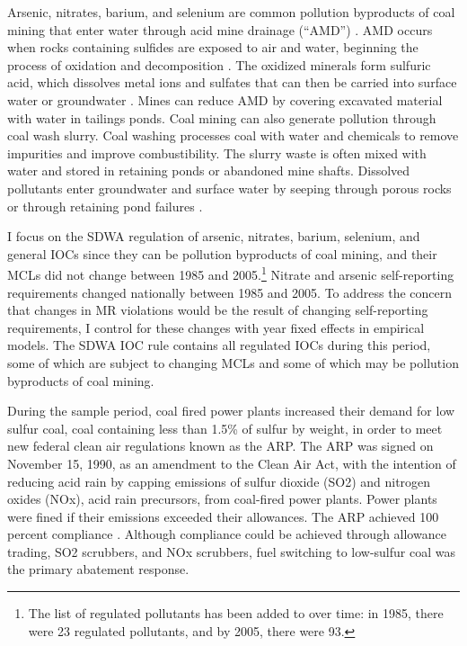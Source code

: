 \documentclass[12pt]{article}
\begin{document}
Arsenic, nitrates, barium, and selenium are common pollution byproducts of coal mining that enter water through acid mine drainage (``AMD'') \parencite{liang2017spatial, boente2020benzo, rouhani2023overview}. AMD occurs when rocks containing sulfides are exposed to air and water, beginning the process of oxidation and decomposition \parencite{ceto2000abandoned}. The oxidized minerals form sulfuric acid, which dissolves metal ions and sulfates that can then be carried into surface water or groundwater \parencite{akcil2006acid, skousen2019acid}. Mines can reduce AMD by covering excavated material with water in tailings ponds. Coal mining can also generate pollution through coal wash slurry. Coal washing processes coal with water and chemicals to remove impurities and improve combustibility. The slurry waste is often mixed with water and stored in retaining ponds or abandoned mine shafts. Dissolved pollutants enter groundwater and surface water by seeping through porous rocks or through retaining pond failures \parencite{Sealey2000}.

I focus on the SDWA regulation of arsenic, nitrates, barium, selenium, and general IOCs since they can be pollution byproducts of coal mining, and their MCLs did not change between 1985 and 2005.\footnote{The list of regulated pollutants has been added to over time: in 1985, there were 23 regulated pollutants, and by 2005, there were 93.} Nitrate and arsenic self-reporting requirements changed nationally between 1985 and 2005. To address the concern that changes in MR violations would be the result of changing self-reporting requirements, I control for these changes with year fixed effects in empirical models. The SDWA IOC rule contains all regulated IOCs during this period, some of which are subject to changing MCLs and some of which may be pollution byproducts of coal mining. 

During the sample period, coal fired power plants increased their demand for low sulfur coal, coal containing less than 1.5\% of sulfur by weight, in order to meet new federal clean air regulations known as the ARP. The ARP was signed on November 15, 1990, as an amendment to the Clean Air Act, with the intention of reducing acid rain by capping emissions of sulfur dioxide (SO2) and nitrogen oxides (NOx), acid rain precursors, from coal-fired power plants. Power plants were fined if their emissions exceeded their allowances. The ARP achieved 100 percent compliance \parencite{lattanzio2022clean}. Although compliance could be achieved through allowance trading, SO2 scrubbers, and NOx scrubbers, fuel switching to low-sulfur coal was the primary abatement response. 
\end{document}
